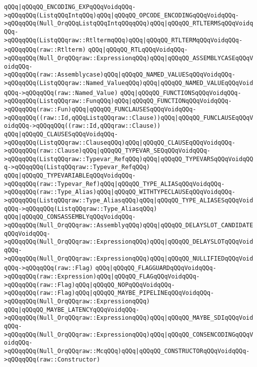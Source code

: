 \verb|qQQq|\verb#|qQQqQQ_ENCODING_EXPqQQqVoidqQQq->qQQqqQQq(ListqQQqIntqQQq)qQQq|qQQqQQ_OPCODE_ENCODINGqQQqVoidqQQq->qQQqqQQq(Null_OrqQQqListqQQqIntqQQqqQQq)qQQq|qQQqQQ_RTLTERMSqQQqVoidqQQq->qQQqqQQq(ListqQQqraw::RtltermqQQq)qQQq|qQQqQQ_RTLTERMqQQqVoidqQQq->qQQqqQQq(raw::Rtlterm)#\newline
\verb|qQQq|\verb#|qQQqQQ_RTLqQQqVoidqQQq->qQQqqQQq(Null_OrqQQqraw::ExpressionqQQq)qQQq|qQQqQQ_ASSEMBLYCASEqQQqVoidqQQq->qQQqqQQq(raw::Assemblycase)qQQq|qQQqQQ_NAMED_VALUESqQQqVoidqQQq->qQQqqQQq(ListqQQqraw::Named_ValueqQQq)qQQq|qQQqQQ_NAMED_VALUEqQQqVoidqQQq->qQQqqQQq(raw::Named_Value)#\newline
\verb|qQQq|\verb#|qQQqQQ_FUNCTIONSqQQqVoidqQQq->qQQqqQQq(ListqQQqraw::FunqQQq)qQQq|qQQqQQ_FUNCTIONqQQqVoidqQQq->qQQqqQQq(raw::Fun)qQQq|qQQqQQ_FUNCLAUSESqQQqVoidqQQq->qQQqqQQq((raw::Id,qQQqListqQQqraw::Clause))qQQq|qQQqQQ_FUNCLAUSEqQQqVoidqQQq->qQQqqQQq((raw::Id,qQQqraw::Clause))#\newline
\verb|qQQq|\verb#|qQQqQQ_CLAUSESqQQqVoidqQQq->qQQqqQQq(ListqQQqraw::ClauseqQQq)qQQq|qQQqQQ_CLAUSEqQQqVoidqQQq->qQQqqQQq(raw::Clause)qQQq|qQQqQQ_TYPEVAR_SEQqQQqVoidqQQq->qQQqqQQq(ListqQQqraw::Typevar_RefqQQq)qQQq|qQQqQQ_TYPEVARSqQQqVoidqQQq->qQQqqQQq(ListqQQqraw::Typevar_RefqQQq)#\newline
\verb|qQQq|\verb#|qQQqQQ_TYPEVARIABLEqQQqVoidqQQq->qQQqqQQq(raw::Typevar_Ref)qQQq|qQQqQQ_TYPE_ALIASqQQqVoidqQQq->qQQqqQQq(raw::Type_Alias)qQQq|qQQqQQ_WITHTYPECLAUSEqQQqVoidqQQq->qQQqqQQq(ListqQQqraw::Type_AliasqQQq)qQQq|qQQqQQ_TYPE_ALIASESqQQqVoidqQQq->qQQqqQQq(ListqQQqraw::Type_AliasqQQq)#\newline
\verb|qQQq|\verb#|qQQqQQ_CONSASSEMBLYqQQqVoidqQQq->qQQqqQQq(Null_OrqQQqraw::AssemblyqQQq)qQQq|qQQqQQ_DELAYSLOT_CANDIDATEqQQqVoidqQQq->qQQqqQQq(Null_OrqQQqraw::ExpressionqQQq)qQQq|qQQqQQ_DELAYSLOTqQQqVoidqQQq->qQQqqQQq(Null_OrqQQqraw::ExpressionqQQq)qQQq|qQQqQQ_NULLIFIEDqQQqVoidqQQq->qQQqqQQq(raw::Flag)#\newline
\verb|qQQq|\verb#|qQQqQQ_FLAGGUARDqQQqVoidqQQq->qQQqqQQq(raw::Expression)qQQq|qQQqQQ_FLAGqQQqVoidqQQq->qQQqqQQq(raw::Flag)qQQq|qQQqQQ_NOPqQQqVoidqQQq->qQQqqQQq(raw::Flag)qQQq|qQQqQQ_MAYBE_PIPELINEqQQqVoidqQQq->qQQqqQQq(Null_OrqQQqraw::ExpressionqQQq)#\newline
\verb|qQQq|\verb#|qQQqQQ_MAYBE_LATENCYqQQqVoidqQQq->qQQqqQQq(Null_OrqQQqraw::ExpressionqQQq)qQQq|qQQqQQ_MAYBE_SDIqQQqVoidqQQq->qQQqqQQq(Null_OrqQQqraw::ExpressionqQQq)qQQq|qQQqQQ_CONSENCODINGqQQqVoidqQQq->qQQqqQQq(Null_OrqQQqraw::McqQQq)qQQq|qQQqQQ_CONSTRUCTORqQQqVoidqQQq->qQQqqQQq(raw::Constructor)#\newline
